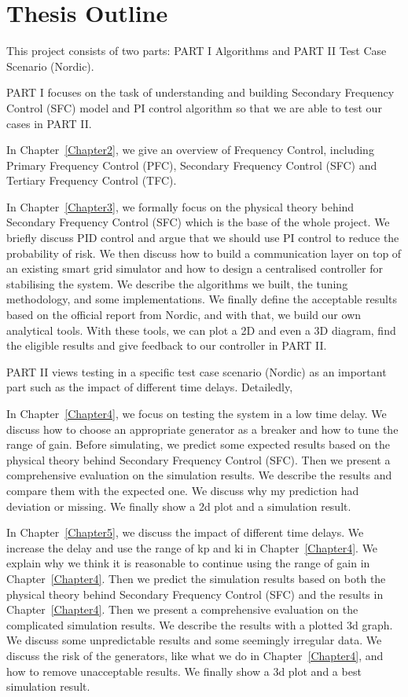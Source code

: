 \section{Thesis Outline} %
This project consists of two parts: PART I Algorithms and PART II Test Case Scenario (Nordic). 

PART I focuses on the task of understanding and building Secondary Frequency Control (SFC) model and PI control algorithm so that we are able to test our cases in PART II. 


In Chapter~\ref{Chapter2}, we give an overview of Frequency Control, including Primary Frequency Control (PFC), Secondary Frequency Control (SFC) and Tertiary Frequency Control (TFC). 

In Chapter~\ref{Chapter3}, we formally focus on the physical theory behind Secondary Frequency Control (SFC) which is the base of the whole project. We briefly discuss PID control and argue that we should use PI control to reduce the probability of risk. We then discuss how to build a communication layer on top of an existing smart grid simulator and how to design a centralised controller for stabilising the system. We describe the algorithms we built, the tuning methodology, and some implementations. We finally define the acceptable results based on the official report from Nordic, and with that, we build our own analytical tools. With these tools, we can plot a 2D and even a 3D diagram, find the eligible results and give feedback to our controller in PART II. 

PART II views testing in a specific test case scenario (Nordic) as an important part such as the impact of different time delays. Detailedly, 

In Chapter~\ref{Chapter4}, we focus on testing the system in a low time delay. We discuss how to choose an appropriate generator as a breaker and how to tune the range of  gain. Before simulating, we predict some expected results based on the physical theory behind Secondary Frequency Control (SFC). Then we present a comprehensive evaluation on the simulation results. We describe the results and compare them with the expected one. We discuss why my prediction had deviation or missing. We finally show a 2d plot and a simulation result. 

In Chapter~\ref{Chapter5}, we discuss the impact of different time delays. We increase the delay and use the range of kp and ki in Chapter~\ref{Chapter4}. We explain why we think it is reasonable to continue using the range of gain in Chapter~\ref{Chapter4}. Then we predict the simulation results based on both the physical theory behind Secondary Frequency Control (SFC) and the results in Chapter~\ref{Chapter4}. Then we present a comprehensive evaluation on the complicated simulation results. We describe the results with a plotted 3d graph. We discuss some unpredictable results and some seemingly irregular data. We discuss the risk of the generators, like what we do in Chapter~\ref{Chapter4}, and how to remove unacceptable results. We  finally show a 3d plot and a best simulation result. 

